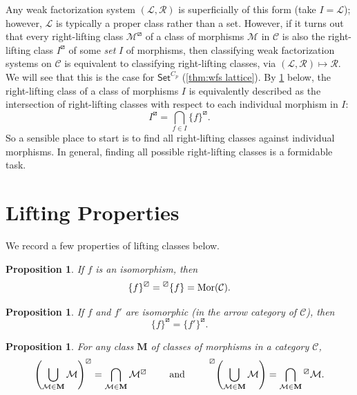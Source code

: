 \documentclass{amsart}
\newcommand{\Set}{\mathsf{Set}}
\newcommand{\CpSet}{\Set^{C_p}}
\newcommand{\cat}{\mathcal}
\newcommand{\catC}{\mathcal{C}}
\newcommand{\llp}[1]{\prescript{\boxslash}{}{#1}}
\newcommand{\rlp}[1]{{#1}^{\boxslash}}
\numberwithin{equation}{section}
\newtheorem{proposition}[equation]{Proposition}
\theoremstyle{definition}
\begin{document}
Any weak factorization system $(\cat L, \cat R)$ is superficially of this form (take $I = \cat L$); however, $\cat L$ is typically a proper class rather than a set. However, if it turns out that every right-lifting class $\rlp{\mathcal M}$ of a class of morphisms $\mathcal M$ in $\catC$ is also the right-lifting class $\rlp{I}$ of some \emph{set} $I$ of morphisms, then classifying weak factorization systems on $\catC$ is equivalent to classifying right-lifting classes, via $(\cat L, \cat R) \mapsto \cat R$. We will see that this is the case for $\CpSet$ (\cref{thm:wfs lattice}).
By \cref{lifting class of union} below, the right-lifting class of a class of morphisms $I$ is equivalently described as the intersection of right-lifting classes with respect to each individual morphism in $I$:
\[
	\rlp{I} = \bigcap_{f \in I} \rlp{\{f\}}.
\]
So a sensible place to start is to find all right-lifting classes against individual morphisms. In general, finding all possible right-lifting classes is a formidable task.



\section{Lifting Properties}

We record a few properties of lifting classes below.

\begin{proposition}\label{proposition:all lift against isos}
	If $f$ is an isomorphism, then
	\[
		\rlp{\{f\}} = \llp{\{f\}} = \operatorname{Mor}(\catC).
	\]
\end{proposition}

\begin{proposition}
	If $f$ and $f'$ are isomorphic (in the arrow category of $\catC$), then
	\[
		\rlp{\{f\}} = \rlp{\{f'\}}.
	\]
\end{proposition}

\begin{proposition}
	\label{lifting class of union}
	For any class $\mathbf{M}$ of classes of morphisms in a category $\catC$,
	\[
		\rlp{\left(\bigcup_{\mathcal{M} \in \mathbf{M}} \mathcal{M}\right)}
		= \bigcap_{\mathcal{M} \in \mathbf{M}} \rlp{\mathcal{M}}
		\qquad
		\text{ and }
		\qquad
		\llp{\left(\bigcup_{\mathcal{M} \in \mathbf{M}} \mathcal{M}\right)}
		= \bigcap_{\mathcal{M} \in \mathbf{M}} \llp{\mathcal{M}}.
	\]
\end{proposition}
\end{document}
